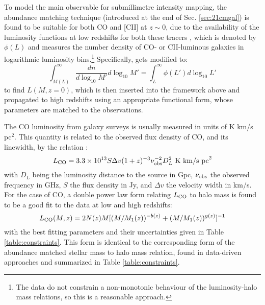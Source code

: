 To model the main observable for submillimetre intensity mapping, the abundance matching technique (introduced at the end of Sec. \ref{sec:21cmgal}) is found to be suitable for both CO and [CII] at $z \sim 0$, due to the availability of the luminosity functions at low redshifts for both these tracers \cite{hemmati2017, keres2003}, which is denoted by $\phi(L)$ and measures the number density of CO- or CII-luminous galaxies in logarithmic luminosity bins.\footnote{The data do not constrain a non-monotonic behaviour of the luminosity-halo mass relations, so this is a reasonable approach.} Specifically,  gets modified to:
\begin{equation}
    \int_{M(L)}^{\infty} \frac{dn}{d \log_{10} M'} d \log_{10} M' = \int_{L}^{\infty} \phi(L') d \log_{10} L'
    \label{abmatchsubmm}
\end{equation}
to find $L(M,z = 0)$, which is then inserted into the framework above and propagated to high redshifts using an appropriate functional form, whose parameters are matched to the observations. 

The CO luminosity from galaxy surveys is usually measured in units of K km/s pc$^2$. This quantity is related to  the observed flux density of CO, and its linewidth, by the relation \cite{solomon2006}:
\begin{equation}
 L_{\rm CO} = 3.3 \times 10^{13} S \Delta v (1 + z)^{-3} \nu_{\rm obs}^{-2} D_L^2 \ \rm{K \  km/s \  pc}^2
\end{equation} 
with $D_L$ being the luminosity distance to the source in Gpc, $\nu_{\rm obs}$ the observed frequency in GHz, $S$ the flux density  in Jy, and $\Delta v$ the velocity width  in km/s. For the case of CO, a double power law form relating $L_{\rm CO}$ to halo mass is found to be a good fit to the data at low and high redshifts:
\begin{equation}
    L_{\rm CO} (M, z) = 2N(z) M [(M/M_1(z))^{-b(z)} + (M/M_1(z))^{y(z)}]^{-1}
\end{equation}
with the best fitting parameters and their uncertainties given in Table \ref{table:constraints}. This form is identical to the corresponding form of the abundance matched stellar mass to halo mass relation, found in data-driven approaches \cite{behroozi2010, behroozi2019, moster2010} and summarized in Table \ref{table:constraints}. 


